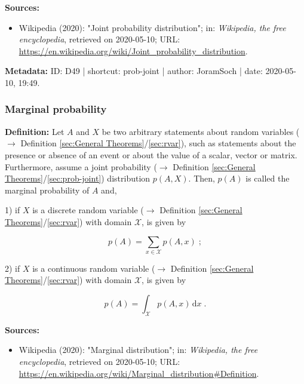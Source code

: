 \documentclass[a4paper,12pt,twoside]{book}
\begin{document}
\vspace{1em}
\textbf{Sources:}
\begin{itemize}
\item Wikipedia (2020): "Joint probability distribution"; in: \textit{Wikipedia, the free encyclopedia}, retrieved on 2020-05-10; URL: \url{https://en.wikipedia.org/wiki/Joint_probability_distribution}.
\end{itemize}


\vspace{1em}
\textbf{Metadata:} ID: D49 | shortcut: prob-joint | author: JoramSoch | date: 2020-05-10, 19:49.
\vspace{1em}



\subsubsection[\textit{Marginal probability}]{Marginal probability} \label{sec:prob-marg}
\setcounter{equation}{0}

\textbf{Definition:} Let $A$ and $X$ be two arbitrary statements about random variables ($\rightarrow$ Definition \ref{sec:General Theorems}/\ref{sec:rvar}), such as statements about the presence or absence of an event or about the value of a scalar, vector or matrix. Furthermore, assume a joint probability ($\rightarrow$ Definition \ref{sec:General Theorems}/\ref{sec:prob-joint}) distribution $p(A,X)$. Then, $p(A)$ is called the marginal probability of $A$ and,

1) if $X$ is a discrete random variable ($\rightarrow$ Definition \ref{sec:General Theorems}/\ref{sec:rvar}) with domain $\mathcal{X}$, is given by

\begin{equation} \label{eq:prob-marg-prob-marg-disc}
p(A) = \sum_{x \in \mathcal{X}} p(A,x) \; ;
\end{equation}

2) if $X$ is a continuous random variable ($\rightarrow$ Definition \ref{sec:General Theorems}/\ref{sec:rvar}) with domain $\mathcal{X}$, is given by

\begin{equation} \label{eq:prob-marg-prob-marg-cont}
p(A) = \int_{\mathcal{X}} p(A,x) \, \mathrm{d}x \; .
\end{equation}


\vspace{1em}
\textbf{Sources:}
\begin{itemize}
\item Wikipedia (2020): "Marginal distribution"; in: \textit{Wikipedia, the free encyclopedia}, retrieved on 2020-05-10; URL: \url{https://en.wikipedia.org/wiki/Marginal_distribution#Definition}.
\end{itemize}
\end{document}
